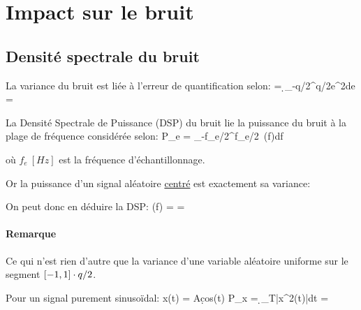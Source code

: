 

\newpage
\section{Impact sur le bruit}


\subsection{Densité spectrale du bruit}

\bdefbox
    La variance du bruit est liée à l'erreur de quantification selon:
    \be
         = \d \int_{-q/2}^{q/2}e^2de = 
    \ee

    La Densité Spectrale de Puissance (DSP) du bruit lie la puissance du bruit
    à la plage de fréquence considérée selon:
    \be
        P_e = \int_{-f_e/2}^{f_e/2}~\gamma(f)df \tq \gamma\equiv [W/Hz]
    \ee

    où $f_e~[Hz]$ est la fréquence d'échantillonnage.
\edefbox

Or la puissance d'un signal aléatoire \underline{centré} est exactement sa variance:
\be
\ee

On peut donc en déduire la DSP:
\be
    \gamma(f) =  = 
\ee

\paragraph{Remarque}
Ce qui n'est rien d'autre que la variance d'une variable aléatoire uniforme
sur le segment $[-1,1]\cdot q/2$.

\bdbox
    Pour un signal purement sinusoïdal:
    \be
        x(t) = A\d cos(\omega t) \implies
        P_x = \d\int_T|x^2(t)|dt = 
    \ee


